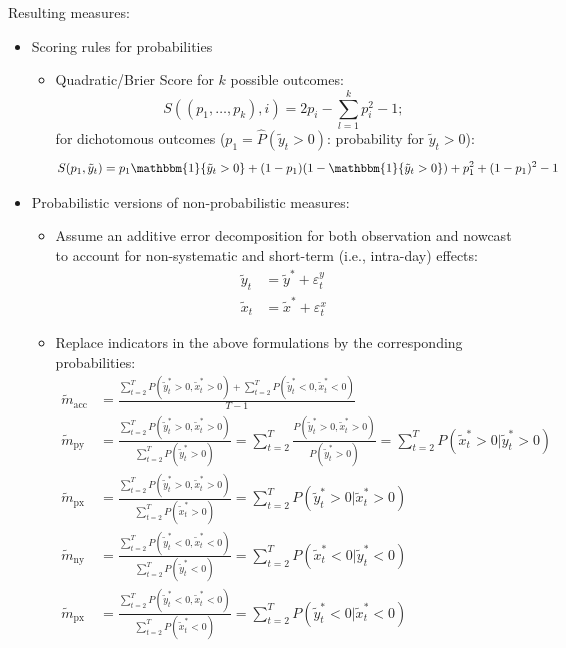 \documentclass[oneside]{article}
\theoremstyle{plain}%
\theoremstyle{definition}
\newcommand{\ind}[1]{\mathbbm{1}\{#1\}}
\newcommand{\ydiff}{\tilde{y}}
\newcommand{\ydifft}{\tilde{y}^*}
\newcommand{\xdiff}{\tilde{x}}
\newcommand{\xdifft}{\tilde{x}^*}
\newcommand{\Prob}[1]{P(#1)}
\newcommand{\mprob}{\tilde{m}}
\begin{document}
Resulting measures:
\begin{itemize}
  \item Scoring rules for probabilities

\begin{itemize}
  \item Quadratic/Brier Score for $k$ possible outcomes: \begin{equation}
  S((p_1, \dots, p_k), i) = 2 p_i - \sum_{l=1}^k p_i^2 - 1;
\end{equation}
for dichotomous outcomes ($p_1 = \hat{P}(\ydiff_t > 0)$: probability for $\ydiff_t > 0$):
\begin{equation}
  S(p_1, \ydiff_t) = p_1 \ind{\ydiff_t > 0} + (1 - p_1) (1 - \ind{\ydiff_t > 0}) + p_1^2 + (1-p_1)^2 - 1
\end{equation}
\end{itemize}
\item Probabilistic versions of non-probabilistic measures:
\begin{itemize}
  \item Assume an additive error decomposition for both observation and nowcast to account for non-systematic and short-term (i.e., intra-day) effects:
  	\begin{align}
  		\ydiff_t &= \ydifft + \varepsilon_t^y \\
  		\xdiff_t &= \xdifft + \varepsilon_t^x
	\end{align}
\item  Replace indicators in the above formulations by the corresponding probabilities:
\begin{align}
		\mprob_{\text{acc}} &= \frac{\sum_{t=2}^T \Prob{ \ydifft_t > 0, \xdifft_t > 0} + \sum_{t=2}^T \Prob{\ydifft_t < 0, \xdifft_t < 0}}{T-1}  \\
   \mprob_{\text{py}} &= \frac{\sum_{t=2}^T \Prob{\ydifft_t > 0, \xdifft_t > 0}}{\sum_{t=2}^T \Prob{\ydifft_t > 0}} = \sum_{t=2}^T \frac{\Prob{\ydifft_t > 0, \xdifft_t > 0}}{\Prob{\ydifft_t > 0}} = \sum_{t=2}^T \Prob{\xdifft_t > 0 | \ydifft_t > 0} \\
    \mprob_{\text{px}} &= \frac{\sum_{t=2}^T \Prob{\ydifft_t > 0, \xdifft_t > 0}}{\sum_{t=2}^T \Prob{\xdifft_t > 0}} = \sum_{t=2}^T \Prob{\ydifft_t > 0 | \xdifft_t > 0} \\
    \mprob_{\text{ny}} &= \frac{\sum_{t=2}^T \Prob{\ydifft_t < 0, \xdifft_t < 0}}{\sum_{t=2}^T \Prob{\ydifft_t < 0}} = \sum_{t=2}^T \Prob{\xdifft_t < 0 | \ydifft_t < 0} \\
    \mprob_{\text{px}} &= \frac{\sum_{t=2}^T \Prob{\ydifft_t < 0, \xdifft_t < 0}}{\sum_{t=2}^T \Prob{\xdifft_t < 0}} = \sum_{t=2}^T \Prob{\ydifft_t < 0 | \xdifft_t < 0}

\end{align}
\end{itemize}
\end{itemize}
\end{document}

